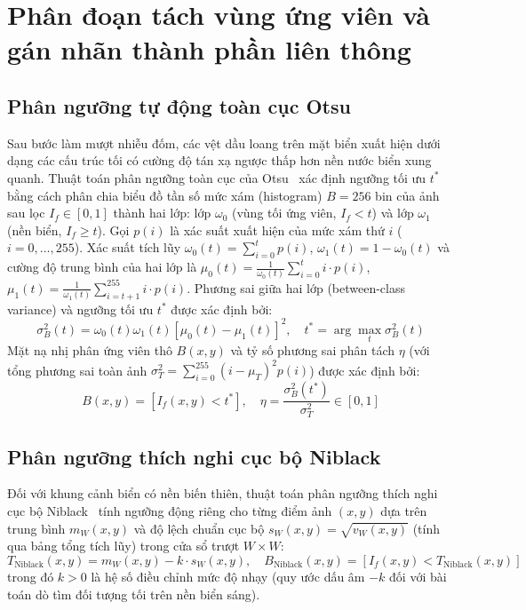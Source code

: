 \section{Phân đoạn tách vùng ứng viên và gán nhãn thành phần liên thông}
\label{sec:phan_nguong_vung}

\subsection{Phân ngưỡng tự động toàn cục Otsu}

Sau bước làm mượt nhiễu đốm, các vệt dầu loang trên mặt biển xuất hiện dưới dạng các cấu trúc tối có cường độ tán xạ ngược thấp hơn nền nước biển xung quanh. Thuật toán phân ngưỡng toàn cục của Otsu~\cite{otsu1979threshold} xác định ngưỡng tối ưu $t^*$ bằng cách phân chia biểu đồ tần số mức xám (histogram) $B = 256$ bin của ảnh sau lọc $I_f \in [0, 1]$ thành hai lớp: lớp $\omega_0$ (vùng tối ứng viên, $I_f < t$) và lớp $\omega_1$ (nền biển, $I_f \ge t$). Gọi $p(i)$ là xác suất xuất hiện của mức xám thứ $i$ ($i = 0, \dots, 255$). Xác suất tích lũy $\omega_0(t) = \sum_{i=0}^{t} p(i)$, $\omega_1(t) = 1 - \omega_0(t)$ và cường độ trung bình của hai lớp là $\mu_0(t) = \frac{1}{\omega_0(t)}\sum_{i=0}^{t} i \cdot p(i)$, $\mu_1(t) = \frac{1}{\omega_1(t)}\sum_{i=t+1}^{255} i \cdot p(i)$. Phương sai giữa hai lớp (between-class variance) và ngưỡng tối ưu $t^*$ được xác định bởi:
\begin{equation}
\sigma_B^2(t) = \omega_0(t)\omega_1(t) \left[ \mu_0(t) - \mu_1(t) \right]^2, \quad t^* = \arg\max_{t} \sigma_B^2(t)
\label{eq:otsu_between}
\end{equation}
Mặt nạ nhị phân ứng viên thô $B(x, y)$ và tỷ số phương sai phân tách $\eta$ (với tổng phương sai toàn ảnh $\sigma_T^2 = \sum_{i=0}^{255} (i - \mu_T)^2 p(i)$) được xác định bởi:
\begin{equation}
B(x, y) = [I_f(x, y) < t^*], \quad \eta = \frac{\sigma_B^2(t^*)}{\sigma_T^2} \in [0, 1]
\label{eq:binary_candidate_mask}
\end{equation}

\subsection{Phân ngưỡng thích nghi cục bộ Niblack}

Đối với khung cảnh biển có nền biến thiên, thuật toán phân ngưỡng thích nghi cục bộ Niblack~\cite{niblack1986introduction} tính ngưỡng động riêng cho từng điểm ảnh $(x, y)$ dựa trên trung bình $m_W(x, y)$ và độ lệch chuẩn cục bộ $s_W(x, y) = \sqrt{v_W(x, y)}$ (tính qua bảng tổng tích lũy) trong cửa sổ trượt $W \times W$:
\begin{equation}
T_{\text{Niblack}}(x, y) = m_W(x, y) - k \cdot s_W(x, y), \quad B_{\text{Niblack}}(x, y) = [I_f(x, y) < T_{\text{Niblack}}(x, y)]
\label{eq:niblack_formula}
\end{equation}
trong đó $k > 0$ là hệ số điều chỉnh mức độ nhạy (quy ước dấu âm $-k$ đối với bài toán dò tìm đối tượng tối trên nền biển sáng).

